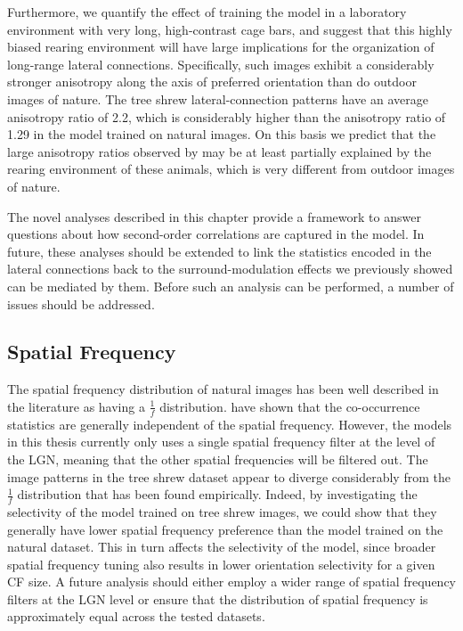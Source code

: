Furthermore, we quantify the effect of training the model in a
laboratory environment with very long, high-contrast cage bars, and
suggest that this highly biased rearing environment will have large
implications for the organization of long-range lateral connections.
Specifically, such images exhibit a considerably stronger anisotropy
along the axis of preferred orientation than do outdoor images of
nature.  The tree shrew lateral-connection patterns have an average
anisotropy ratio of 2.2, which is considerably higher than the
anisotropy ratio of 1.29 in the model trained on natural images. On
this basis we predict that the large anisotropy ratios observed by
\citep{Bosking1997} may be at least partially explained by the rearing
environment of these animals, which is very different from outdoor
images of nature.

The novel analyses described in this chapter provide a framework to
answer questions about how second-order correlations are captured in
the model. In future, these analyses should be extended to link the
statistics encoded in the lateral connections back to the
surround-modulation effects we previously showed can be mediated by
them. Before such an analysis can be performed, a number of issues
should be addressed.

\subsection{Spatial Frequency}

The spatial frequency distribution of natural images has been well
described in the literature as having a $\frac{1}{f}$
distribution. \cite{Perrinet2015} have shown that the co-occurrence
statistics are generally independent of the spatial
frequency. However, the models in this thesis currently only uses a
single spatial frequency filter at the level of the LGN, meaning that
the other spatial frequencies will be filtered out. The image patterns
in the tree shrew dataset appear to diverge considerably from the
$\frac{1}{f}$ distribution that has been found empirically. Indeed, by
investigating the selectivity of the model trained on tree shrew
images, we could show that they generally have lower spatial frequency
preference than the model trained on the natural dataset. This in turn
affects the selectivity of the model, since broader spatial frequency
tuning also results in lower orientation selectivity for a given CF
size. A future analysis should either employ a wider range of spatial
frequency filters at the LGN level or ensure that the distribution of
spatial frequency is approximately equal across the tested datasets.

